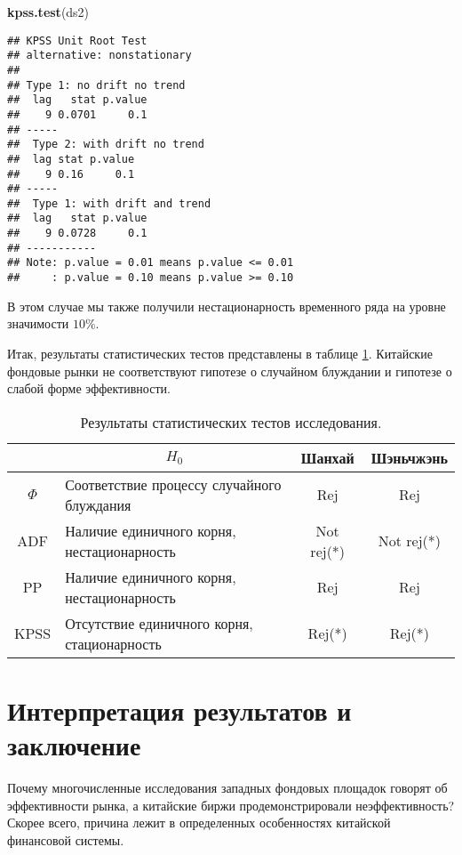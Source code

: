 \documentclass[a4paper,12pt]{article}
\newenvironment{Shaded}{\begin{snugshade}}{\end{snugshade}}
\newcommand{\KeywordTok}[1]{\textcolor[rgb]{0.13,0.29,0.53}{\textbf{#1}}}
\newcommand{\NormalTok}[1]{#1}
\begin{document}
\begin{Shaded}
\begin{Highlighting}[]
\KeywordTok{kpss.test}\NormalTok{(ds2)}
\end{Highlighting}
\end{Shaded}

\begin{multicols}{2}\begin{Verbatim}[fontsize=\small]
## KPSS Unit Root Test
## alternative: nonstationary
##
## Type 1: no drift no trend
##  lag   stat p.value
##    9 0.0701     0.1
## -----
##  Type 2: with drift no trend
##  lag stat p.value
##    9 0.16     0.1
## -----
##  Type 1: with drift and trend
##  lag   stat p.value
##    9 0.0728     0.1
## -----------
## Note: p.value = 0.01 means p.value <= 0.01
##     : p.value = 0.10 means p.value >= 0.10
\end{Verbatim}
\end{multicols}

В этом случае мы также получили нестационарность временного ряда на уровне значимости $10\%$.

Итак, результаты статистических тестов представлены в таблице \ref{tab:modres}. Китайские фондовые рынки не соответствуют гипотезе о случайном блуждании и гипотезе о слабой форме эффективности.

\begin{table}[]
\centering
\caption{Результаты статистических тестов исследования.}
\label{tab:modres}
\begin{tabular}{|c|l|c|c|}
\hline
\multicolumn{1}{|l|}{} & \multicolumn{1}{c|}{$H_0$} & Шанхай & Шэньчжэнь \\ \hline
$\Phi$ & Соответствие процессу случайного блуждания & Rej & Rej \\ \hline
ADF & Наличие единичного корня, нестационарность & Not rej(*) & Not rej(*) \\ \hline
PP & Наличие единичного корня, нестационарность & Rej & Rej \\ \hline
KPSS & Отсутствие единичного корня, стационарность & Rej(*) & Rej(*) \\ \hline
\end{tabular}
\end{table}
\newpage
\section{Интерпретация результатов и заключение}\label{sec:res}

Почему многочисленные исследования западных фондовых площадок говорят об эффективности рынка, а китайские биржи продемонстрировали неэффективность? Скорее всего, причина лежит в определенных особенностях китайской финансовой системы.
\end{document}
